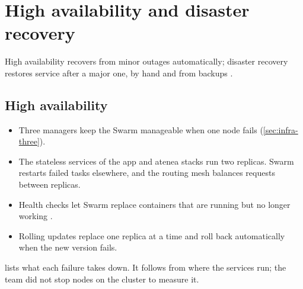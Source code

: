 \section{High availability and disaster recovery}
\label{sec:hadr}

High availability recovers from minor outages automatically; disaster
recovery restores service after a major one, by hand and from backups
\parencite{schmidt2006ha,llusa2026hadr}.

\subsection{High availability}
\label{sec:hadr-ha}

\begin{itemize}
  \item Three managers keep the Swarm manageable when one node fails
        (\cref{sec:infra-three}).
  \item The stateless services of the app and atenea stacks run two
        replicas. Swarm restarts failed tasks elsewhere, and the routing
        mesh balances requests between replicas.
  \item Health checks let Swarm replace containers that are running but
        no longer working \parencite{llusa2026production}.
  \item Rolling updates replace one replica at a time and roll back
        automatically when the new version fails.
\end{itemize}

 lists what each failure takes down. It follows from
where the services run; the team did not stop nodes on the cluster to
measure it.

